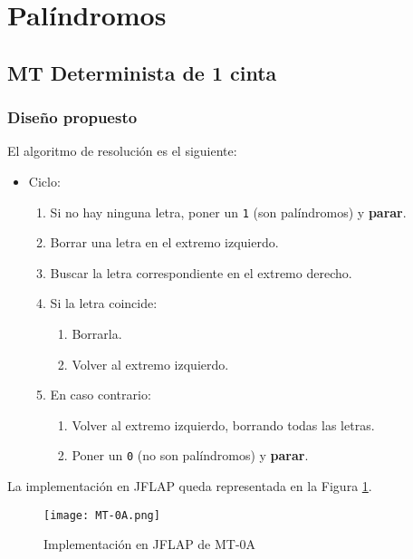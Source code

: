 \section{Palíndromos}

\subsection{MT Determinista de 1 cinta}

\subsubsection*{Diseño propuesto}
El algoritmo de resolución es el siguiente:

\begin{itemize}
    \item Ciclo:
    \begin{enumerate}[1.]
        \item Si no hay ninguna letra, poner un \texttt{1} (son palíndromos) y \textbf{parar}.
        \item Borrar una letra en el extremo izquierdo.
        \item Buscar la letra correspondiente en el extremo derecho.
        \item Si la letra coincide:
        \begin{enumerate}[1.]
            \item Borrarla.
            \item Volver al extremo izquierdo.
        \end{enumerate}
        \item En caso contrario:
        \begin{enumerate}[1.]
            \item Volver al extremo izquierdo, borrando todas las letras.
            \item Poner un \texttt{0} (no son palíndromos) y \textbf{parar}.
        \end{enumerate}
    \end{enumerate}
\end{itemize}

La implementación en JFLAP queda representada en la Figura \ref{fig:MT-0A}.

\begin{figure}[h]
    \texttt{[image: MT-0A.png]}
    \caption{Implementación en JFLAP de MT-0A}
    \label{fig:MT-0A}
\end{figure}


